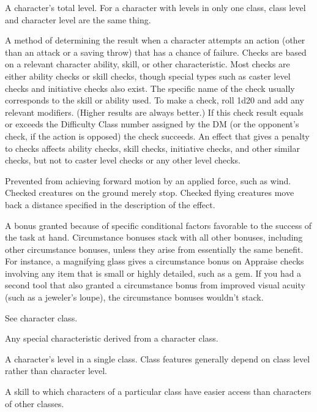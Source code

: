  A character's total level. For a character with 
levels in only one class, class level and character level are the same 
thing. 

 A method of determining the result when a character 
attempts an action (other than an attack or a saving throw) that has a 
chance of failure. Checks are based on a relevant character ability, 
skill, or other characteristic. Most checks are either ability checks or 
skill checks, though special types such as caster 
level checks and initiative checks also exist. The 
specific name of the check usually corresponds to the skill or ability 
used. To make a check, roll 1d20 and add any relevant modifiers. 
(Higher results are always better.) If this check result equals or 
exceeds the Difficulty Class number assigned by the DM (or the 
opponent's check, if the action is opposed) the check succeeds. An effect that gives a penalty to checks affects ability checks, skill checks, initiative checks, and other similar checks, but not to caster level checks or any other level checks.

 Prevented from achieving forward motion by an 
applied force, such as wind. Checked creatures on the ground 
merely stop. Checked flying creatures move back a distance specified in the description of the effect. 

 A bonus granted because of specific 
conditional factors favorable to the success of the task at hand. 
Circumstance bonuses stack with all other bonuses, including other 
circumstance bonuses, unless they arise from essentially the same 
benefit. For instance, a magnifying glass gives a  circumstance 
bonus on Appraise checks involving any item that is small or highly 
detailed, such as a gem. If you had a second tool that also granted a 
circumstance bonus from improved visual acuity (such as a jeweler's 
loupe), the circumstance bonuses wouldn't stack. 

 See character class. 

 Any special characteristic derived from a character 
class. 

 A character's level in a single class. Class features 
generally depend on class level rather than character level. 

 A skill to which characters of a particular class have 
easier access than characters of other classes.

